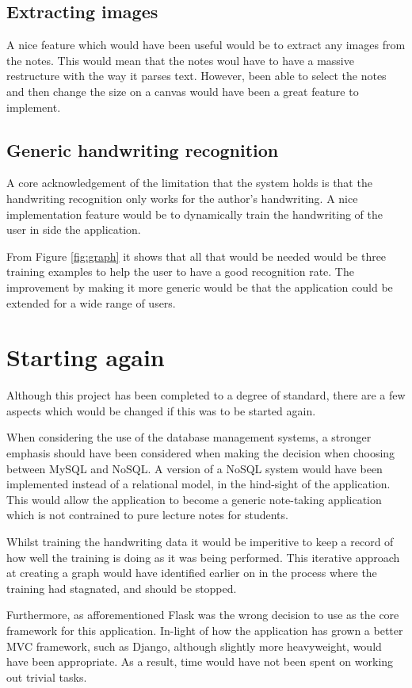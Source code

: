 \subsection{Extracting images}
A nice feature which would have been useful would be to extract any images from the notes. This would mean that the notes woul have to have a massive restructure with the way it parses text. However, been able to select the notes and then change the size on a canvas would have been a great feature to implement.

\subsection{Generic handwriting recognition}
A core acknowledgement of the limitation that the system holds is that the handwriting recognition only works for the author's handwriting. A nice implementation feature would be to dynamically train the handwriting of the user in side the application.

From Figure \ref{fig:graph} it shows that all that would be needed would be three training examples to help the user to have a good recognition rate. The improvement by making it more generic would be that the application could be extended for a wide range of users.


\section{Starting again}
Although this project has been completed to a degree of standard, there are a few aspects which would be changed if this was to be started again.

When considering the use of the database management systems, a stronger emphasis should have been considered when making the decision when choosing between MySQL and NoSQL. A version of a NoSQL system would have been implemented instead of a relational model, in the hind-sight of the application. This would allow the application to become a generic note-taking application which is not contrained to pure lecture notes for students.

Whilst training the handwriting data it would be imperitive to keep a record of how well the training is doing as it was being performed. This iterative approach at creating a graph would have identified earlier on in the process where the training had stagnated, and should be stopped.

Furthermore, as afforementioned Flask was the wrong decision to use as the core framework for this application. In-light of how the application has grown a better MVC framework, such as Django, although slightly more heavyweight, would have been appropriate. As a result, time would have not been spent on working out trivial tasks.

